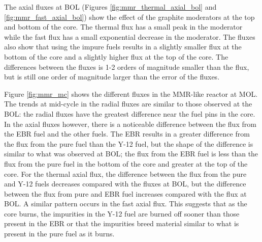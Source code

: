 The axial fluxes at \gls{BOL} (Figures \ref{fig:mmr_thermal_axial_bol} and 
\ref{fig:mmr_fast_axial_bol}) show the effect of the graphite moderators at 
the top and bottom of the core. The thermal flux has a small peak in the 
moderator while the fast flux has a small exponential decrease in the 
moderator. The fluxes also show that using the impure fuels results in 
a slightly smaller flux at the bottom of the core and a slightly higher 
flux at the top of the core. The differences between the 
fluxes is 1-2 orders of magnitude smaller than the flux, but is 
still one order of magnitude larger than the error of the fluxes.

Figure \ref{fig:mmr_mc} shows the different fluxes in the \gls{MMR}-like 
reactor at \gls{MOL}. The trends at mid-cycle in the radial fluxes are 
similar to those observed at the \gls{BOL}: the radial fluxes have the 
greatest difference near the fuel pins in the core. In the axial fluxes 
however, there is a noticeable difference between the flux from the \gls{EBR} 
fuel and the other fuels. The \gls{EBR} results in a greater difference 
from the flux from the pure fuel than the Y-12 fuel, but the shape of 
the difference is similar to what was observed at \gls{BOL}; the flux from 
the \gls{EBR} fuel is less than the flux from the pure fuel in the bottom of 
the core and greater at the top of the core. For the thermal axial flux, 
the difference between the flux from the pure and Y-12 fuels decreases 
compared with the fluxes at \gls{BOL}, but the difference between the flux 
from pure and \gls{EBR} fuel increases compared with the flux at \gls{BOL}. 
A similar pattern occurs in the fast axial flux. This suggests that 
as the core burns, the impurities in the Y-12 fuel are burned off sooner 
than those present in the \gls{EBR} or that the impurities breed material 
similar to what is present in the pure fuel as it burns. 

